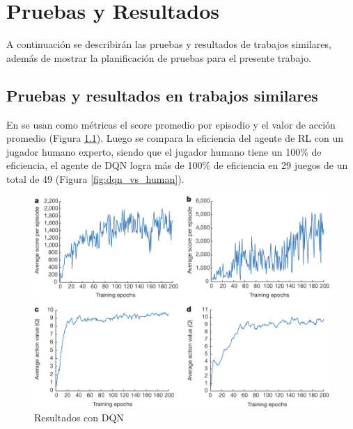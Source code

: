 \chapter{Pruebas y Resultados}

A continuación se describirán las pruebas y resultados de trabajos similares, además de mostrar la planificación de pruebas para el presente trabajo.


\section{Pruebas y resultados en trabajos similares}

En \cite{mnih2015human} se usan como métricas el score promedio por episodio y el valor de acción promedio (Figura \ref{fig:dqn_results}). Luego se compara la eficiencia del agente de \ac{RL} con un jugador humano experto, siendo que el jugador humano tiene un 100\% de eficiencia, el agente de \ac{DQN} logra más de 100\% de eficiencia en 29 juegos de un total de 49 (Figura \ref{fig:dqn_vs_human}).

\begin{figure}[htb]
\centering
\includegraphics[width=150mm]{./graficos/dqn_results.jpg}
\caption{Resultados con DQN} \label{fig:dqn_results}
\end{figure}

